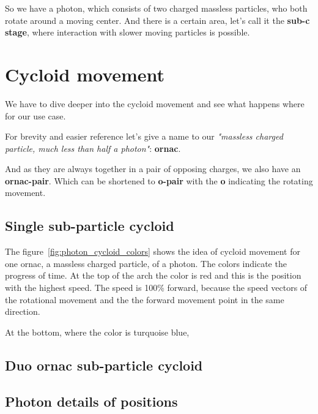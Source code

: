 So we have a photon, which consists of two charged massless particles, who both rotate around a moving center. And there is a certain area, let's call it the \textbf{sub-c stage}, where interaction with slower moving particles is possible.

\section{Cycloid movement}

We have to dive deeper into the cycloid movement and see what happens where for our use case.

For brevity and easier reference let's give a name to our \emph{"massless charged particle, much less than half a photon"}: \textbf{ornac}.

And as they are always together in a pair of opposing charges, we also have an \textbf{ornac-pair}. Which can be shortened to \textbf{o-pair} with the \textbf{o} indicating the rotating movement.

\subsection{Single sub-particle cycloid}



The figure~\vref{fig:photon_cycloid_colors}  shows the idea of cycloid movement for one ornac, a massless charged particle, of a photon. The colors indicate the progress of time. At the top of the arch the color is red and this is the position with the highest speed. The speed is 100\% forward, because the speed vectors of the rotational movement and the the forward movement point in the same direction.

At the bottom, where the color is turquoise blue, 

 







\subsection{Duo ornac sub-particle cycloid}






\subsection{Photon details of positions}







%

